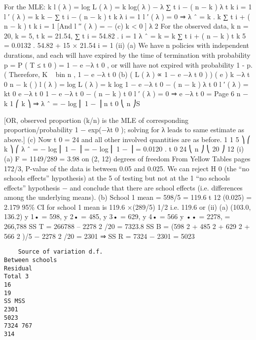 \documentclass[a4paper,12pt]{article}
\begin{document}
For the MLE:
k
l ( λ ) = log L ( λ ) = k log( λ ) − λ ∑ t i − ( n − k ) λ t k
i = 1
l ′ ( λ ) =
k k
− ∑ t i − ( n − k ) t k
λ i = 1
l ′ ( λ ) = 0 ⇒ λ ˆ =
k
.
k
∑ t i + ( n − k ) t k
i = 1
[And l ′′ ( λ ) = −
(c)
k
< 0 ]
λ 2
For the observed data,
k
n = 20, k = 5, t k = 21.54,
∑ t i = 54.82 .
i = 1
λ ˆ =
k
=
k
∑ t i + ( n − k ) t k
5
= 0.0132 .
54.82 + 15 × 21.54
i = 1
(ii)
(a)
We have n policies with independent durations, and each will have
expired by the time of termination with probability
p = P ( T ≤ t 0 ) = 1 − e −λ t 0 ,
or will have not expired with probability 1 - p.
(
Therefore, K ~ bin n , 1 − e −λ t 0
(b)
(
L ( λ ) ∝ 1 − e −λ t 0
)
) ( e )
k
−λ t 0 n − k
(
)
l ( λ ) = log L ( λ ) = k log 1 − e −λ t 0 − ( n − k ) λ t 0
l ′ ( λ ) =
kt 0 e −λ t 0
1 − e −λ t 0
− ( n − k ) t 0
l ′ ( λ ) = 0 ⇒ e −λ t 0 =
Page 6
n − k
1
⎛ k ⎞
⇒ λ ˆ = − log ⎜ 1 − ⎟
n
t 0
⎝ n ⎠S

[OR, observed proportion (k/n) is the MLE of corresponding
proportion/probability {1 − exp(−λt 0 )}; solving for λ leads to same
estimate as above.]
(c)
Now t 0 = 24 and all other involved quantities are as before.
1
1
5 ⎞
⎛ k ⎞
⎛
λ ˆ = − log ⎜ 1 − ⎟ = − log ⎜ 1 − ⎟ = 0.0120 .
t 0
24
⎝ n ⎠
⎝ 20 ⎠
12
(i)
(a)
F = 1149/289 = 3.98 on (2, 12) degrees of freedom
From Yellow Tables pages 172/3, P-value of the data is between 0.05
and 0.025.
We can reject H 0 (the “no schools effects” hypothesis) at the 5%
of testing but not at the 1%
“no schools effects” hypothesis − and conclude that there are school
effects (i.e. differences among the underlying means).
(b)
School 1 mean = 598/5 = 119.6
t 12 (0.025) = 2.179
95\% CI for school 1 mean is 119.6 ×(289/5) 1/2
i.e. 119.6  or
(ii)
(a)
(103.0, 136.2)
y 1• = 598, y 2• = 485, y 3• = 629, y 4• = 566
y •• = 2278, = 266,788
SS T = 266788 – 2278 2 /20 = 7323.8
SS B = (598 2 + 485 2 + 629 2 + 566 2 )/5 − 2278 2 /20 = 2301
⇒ SS R = 7324 − 2301 = 5023

\begin{verbatim}
    Source of variation d.f.
Between schools
Residual
Total 3
16
19
SS MSS
2301
5023
7324 767
314
\end{verbatim}
\end{document}
